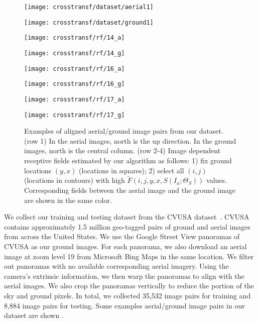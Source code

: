 \begin{figure}
	\newlength{\aheight}
	\setlength{\aheight}{1.75cm}
	\newlength{\gwidth}
	\setlength{\gwidth}{.76\linewidth}
	\newlength{\gspace}
	\setlength{\gspace}{.4cm}
	\centering
	\texttt{[image: crosstransf/dataset/aerial1]}\hspace{6pt}%
	\begin{minipage}[b]{\gwidth}
	\texttt{[image: crosstransf/dataset/ground1]}\vfill
	\end{minipage}\vspace{1pt}
	\texttt{[image: crosstransf/rf/14\_a]}\hspace{6pt}%
	\begin{minipage}[b]{\gwidth}
	\texttt{[image: crosstransf/rf/14\_g]}\vfill
	\end{minipage}\vspace{1pt}
	\texttt{[image: crosstransf/rf/16\_a]}\hspace{6pt}%
	\begin{minipage}[b]{\gwidth}
	\texttt{[image: crosstransf/rf/16\_g]}\vfill
	\end{minipage}\vspace{1pt}
	\texttt{[image: crosstransf/rf/17\_a]}\hspace{6pt}%
	\begin{minipage}[b]{\gwidth}
	\texttt{[image: crosstransf/rf/17\_g]}\vfill
	\end{minipage}\vspace{1pt}

  \caption{Examples of aligned aerial/ground image pairs from our
dataset. (row 1) In the aerial images, north is the up direction.  In
the ground images, north is the central column. (row 2-4) Image
dependent receptive fields estimated by our algorithm as follows: 1)
fix ground locations $(y, x)$ (locations in squares); 2) select all
$(i, j)$ (locations in contours) with high $\tilde{F}(i,j,y,x,
S(I_a; \Theta_S))$ values.  Corresponding fields between the aerial image and
the ground image are shown in the same color.}

  \label{fig:dataset}
\end{figure}

We collect our training and testing dataset from the CVUSA
dataset~\cite{workman2015wide}. CVUSA contains approximately 1.5 million
geo-tagged pairs of ground and aerial images from across the
United States. We use the Google Street View panoramas of CVUSA as our
ground images. For each panorama, we also
download an aerial image at zoom level 19 from Microsoft Bing Maps 
in the same location. We filter out panoramas with no available 
corresponding aerial imagery. Using the camera's extrinsic
information, we then warp the panoramas to align with the
aerial images.  We also crop the panoramas vertically 
to reduce the portion of the sky and
ground pixels.  In total, we collected 35,532 image pairs for
training and 8,884 image pairs for testing. Some examples aerial/ground 
image pairs in our dataset are shown . 

